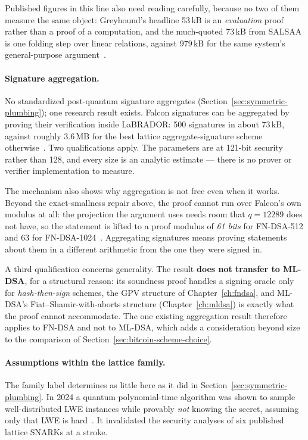 Published figures in this line also need reading carefully, because no two of
them measure the same object: Greyhound's headline 53\,kB is an \emph{evaluation}
proof rather than a proof of a computation, and the much-quoted 73\,kB from
SALSAA is one folding step over linear relations, against 979\,kB for the same
system's general-purpose argument~\cite{salsaa2025}.

\paragraph{Signature aggregation.}
No standardized post-quantum signature aggregates
(Section~\ref{sec:symmetric-plumbing}); one research result exists. Falcon
signatures can be aggregated by proving their
verification inside LaBRADOR: 500 signatures in about 73\,kB, against roughly
3.6\,MB for the best lattice aggregate-signature scheme
otherwise~\cite{falconagg2024}. Two qualifications apply. The parameters are at 121-bit security rather than 128, and every
size is an analytic estimate --- there is no prover or verifier implementation
to measure.

The mechanism also shows why aggregation is not free even when it works. Beyond
the exact-smallness repair above, the proof cannot run over Falcon's own modulus
at all: the projection the argument uses needs room that $q=12289$ does not have,
so the statement is lifted to a proof modulus of \emph{61 bits} for FN-DSA-512
and 63 for FN-DSA-1024~\cite{falconagg2024}. Aggregating signatures means proving
statements about them in a different arithmetic from the one they were signed
in.

A third qualification concerns generality. The result \textbf{does not
transfer to ML-DSA}, for a structural reason: its soundness proof
handles a signing oracle only for \emph{hash-then-sign} schemes, the GPV
structure of Chapter~\ref{ch:fndsa}, and ML-DSA's Fiat--Shamir-with-aborts
structure (Chapter~\ref{ch:mldsa}) is exactly what the proof cannot
accommodate. The one existing aggregation result therefore applies to FN-DSA
and not to ML-DSA, which adds a consideration beyond size to the comparison of
Section~\ref{sec:bitcoin-scheme-choice}.

\paragraph{Assumptions within the lattice family.}
The family label determines as little here as it did in
Section~\ref{sec:symmetric-plumbing}. In 2024 a quantum polynomial-time
algorithm was shown to sample well-distributed LWE
instances while provably \emph{not} knowing the secret, assuming only that LWE
is hard~\cite{obliviouslwe2024}. It invalidated the security analyses of six
published lattice SNARKs at a stroke.

